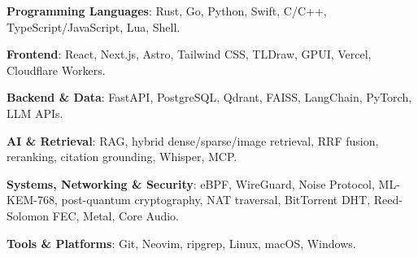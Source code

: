 \documentclass[11pt,a4paper]{article}
\newenvironment{indentsection}[1]
{
    \begin{list}{}{\setlength{\leftmargin}{#1}}
    \item[]
}
{\end{list}}
\begin{document}
\begin{indentsection}{\parindent}
    \begin{description*}
        \item \textbf{Programming Languages}: Rust, Go, Python, Swift, C/C++, TypeScript/JavaScript, Lua, Shell.
        \vspace{0.2em}
        \item \textbf{Frontend}: React, Next.js, Astro, Tailwind CSS, TLDraw, GPUI, Vercel, Cloudflare Workers.
        \vspace{0.2em}
        \item \textbf{Backend \& Data}: FastAPI, PostgreSQL, Qdrant, FAISS, LangChain, PyTorch, LLM APIs.
        \vspace{0.2em}
        \item \textbf{AI \& Retrieval}: RAG, hybrid dense/sparse/image retrieval, RRF fusion, reranking, citation grounding, Whisper, MCP.
        \vspace{0.2em}
        \item \textbf{Systems, Networking \& Security}: eBPF, WireGuard, Noise Protocol, ML-KEM-768, post-quantum cryptography, NAT traversal, BitTorrent DHT, Reed-Solomon FEC, Metal, Core Audio.
        \vspace{0.2em}
        \item \textbf{Tools \& Platforms}: Git, Neovim, ripgrep, Linux, macOS, Windows.
    \end{description*}
\end{indentsection}
\end{document}
